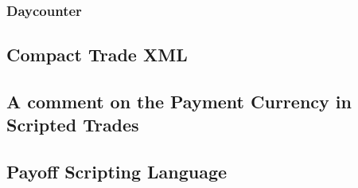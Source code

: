 \subsubsection{Daycounter}


\subsection{Compact Trade XML}\label{compactXml}


\subsection{A comment on the Payment Currency in Scripted Trades}\label{sss:payccy_st}


\subsection{Payoff Scripting Language}\label{app:scriptinglanguage}

